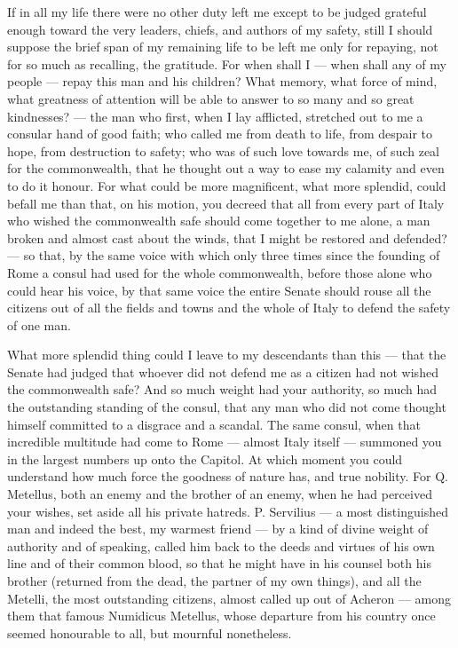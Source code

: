  If in all my life there were no other duty left me except to be judged grateful enough toward the very leaders, chiefs, and authors of my safety, still I should suppose the brief span of my remaining life to be left me only for repaying, not for so much as recalling, the gratitude. For when shall I --- when shall any of my people --- repay this man and his children? What memory, what force of mind, what greatness of attention will be able to answer to so many and so great kindnesses? --- the man who first, when I lay afflicted, stretched out to me a consular hand of good faith; who called me from death to life, from despair to hope, from destruction to safety; who was of such love towards me, of such zeal for the commonwealth, that he thought out a way to ease my calamity and even to do it honour. For what could be more magnificent, what more splendid, could befall me than that, on his motion, you decreed that all from every part of Italy who wished the commonwealth safe should come together to me alone, a man broken and almost cast about the winds, that I might be restored and defended? --- so that, by the same voice with which only three times since the founding of Rome a consul had used for the whole commonwealth, before those alone who could hear his voice, by that same voice the entire Senate should rouse all the citizens out of all the fields and towns and the whole of Italy to defend the safety of one man.

 What more splendid thing could I leave to my descendants than this --- that the Senate had judged that whoever did not defend me as a citizen had not wished the commonwealth safe? And so much weight had your authority, so much had the outstanding standing of the consul, that any man who did not come thought himself committed to a disgrace and a scandal. The same consul, when that incredible multitude had come to Rome --- almost Italy itself --- summoned you in the largest numbers up onto the Capitol. At which moment you could understand how much force the goodness of nature has, and true nobility. For Q. Metellus, both an enemy and the brother of an enemy, when he had perceived your wishes, set aside all his private hatreds. P. Servilius --- a most distinguished man and indeed the best, my warmest friend --- by a kind of divine weight of authority and of speaking, called him back to the deeds and virtues of his own line and of their common blood, so that he might have in his counsel both his brother (returned from the dead, the partner of my own things), and all the Metelli, the most outstanding citizens, almost called up out of Acheron --- among them that famous Numidicus Metellus, whose departure from his country once seemed honourable to all, but mournful nonetheless.

